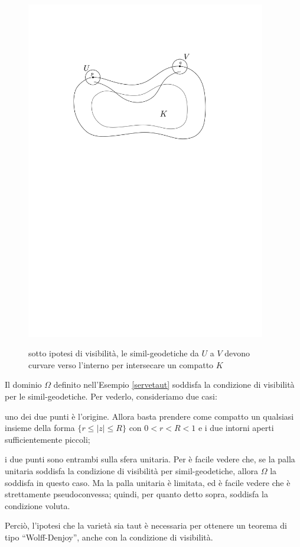 \begin{figure}[h!]
    \begin{center}
        \includegraphics[width=0.935\textwidth, trim=0 18cm 0 5cm]{Immagini/vis2.png} \\
        \caption{sotto ipotesi di visibilità, le simil-geodetiche da $U$ a $V$ devono curvare verso l'interno per intersecare un compatto $K$}
    \end{center}
\end{figure}

\begin{ftt}
    Il dominio $\Omega$ definito nell'Esempio \ref{servetaut} soddisfa la condizione di visibilità per le simil-geodetiche. Per vederlo, consideriamo due casi:
    \begin{nlist}
        \item uno dei due punti è l'origine. Allora basta prendere come compatto un qualsiasi insieme della forma $\{r \le |z| \le R\}$ con $0<r<R<1$ e i due intorni aperti sufficientemente piccoli;
        \item i due punti sono entrambi sulla sfera unitaria. Per \cite[Proposition 6]{NTT} è facile vedere che, se la palla unitaria soddisfa la condizione di visibilità per simil-geodetiche, allora $\Omega$ la soddisfa in questo caso. Ma la palla unitaria è limitata, ed è facile vedere che è strettamente pseudoconvessa; quindi, per quanto detto sopra, soddisfa la condizione voluta.
    \end{nlist}
    Perciò, l'ipotesi che la varietà sia taut è necessaria per ottenere un teorema di tipo ``Wolff-Denjoy'', anche con la condizione di visibilità.
\end{ftt}
